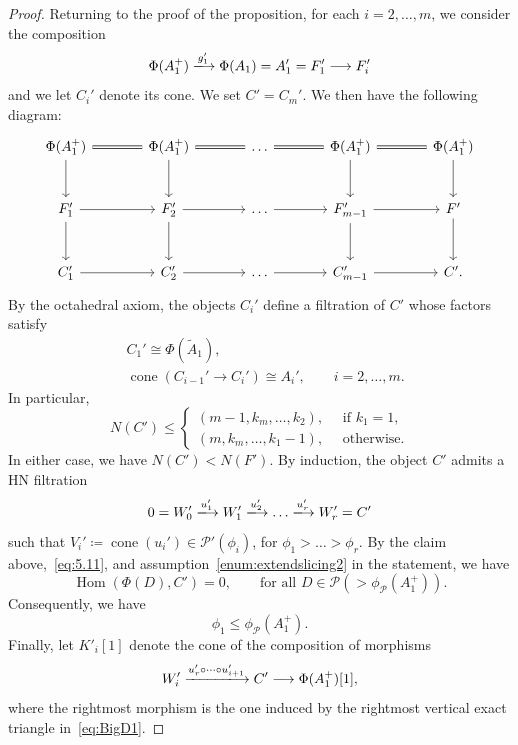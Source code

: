 \documentclass[11pt, reqno]{amsart}
\numberwithin{equation}{section}
\theoremstyle{plain}
\theoremstyle{remark}
\theoremstyle{definition}
\theoremstyle{italicsname}
\DeclareMathOperator{\Hom}{Hom}
\DeclareMathOperator{\cone}{cone}
\newcommand{\cP}{\mathscr{P}}
\begin{document}
\begin{proof}
Returning to the proof of the proposition, for each $i=2,\dots,m$, we consider the composition
\[
\Phi(A_1^+)\xlongrightarrow{g'_1} \Phi(A_1)=A'_1=F'_1\longrightarrow F'_i
\]
and we let $C_i'$ denote its cone. 
We set $C'=C_m'$.
We then have the following diagram:
\begin{equation}\label{eq:BigD1}
\begin{tikzcd}[column sep=large,row sep=large]
\Phi(A_1^+) \arrow[d]
    & \Phi(A_1^+) \arrow[l,equal] \arrow[d]
    & \dots \arrow[l,equal]
    & \Phi(A_1^+) \arrow[l,equal] \arrow[d]
    & \Phi(A_1^+) \arrow[l,equal] \arrow[d]
\\
F'_1 \arrow[r]\arrow[d]
    & F'_2 \arrow[r]\arrow[d]
    & \dots \arrow[r]
    & F'_{m-1} \arrow[r]\arrow[d]
    & F'\arrow[d]
\\
C_1' \arrow[r]
    & C_2' \arrow[r]
    & \dots \arrow[r]
    & C_{m-1}' \arrow[r]
    & C'.
\end{tikzcd}
\end{equation}
By the octahedral axiom, the objects $C_i'$ define a filtration of $C'$ whose factors satisfy
\begin{equation}\label{eq:5.11}
\begin{split}
&C_1'\cong\Phi(\widetilde{A}_1),\\
&\cone(C_{i-1}'\to C_i')\cong  A_i',\qquad i=2,\dots,m.
\end{split}
\end{equation}
In particular,
\[
N(C')\leq\begin{cases}
(m-1,k_m,\dots,k_2),\quad\text{ if } k_1=1,\\
(m,k_m,\dots,k_1-1),\quad\text{ otherwise.}
\end{cases}
\]
In either case, we have $N(C')<N(F')$.
By induction, the object $C'$ admits a HN filtration
\[
0=W_0'\xlongrightarrow{u_1'}W_1'\xlongrightarrow{u_2'}\dots\xlongrightarrow{u_r'} W_r'=C'
\]
such that $V_i'\coloneqq\cone(u_i')\in\cP'(\phi_i)$, for $\phi_1>\dots>\phi_r.$
By the claim above,~\eqref{eq:5.11}, and assumption~\ref{enum:extendslicing2} in the statement, we have
\[
\Hom(\Phi(D),C')=0,\qquad \text{for all } D\in\cP\left(>\phi_\cP(A_1^+)\right).
\]
Consequently, we have
\begin{equation}\label{eq:Phases1}
\phi_1\leq\phi_\cP(A_1^+).
\end{equation}
Finally, let $K'_i[1]$ denote the cone of the composition of morphisms
\[
W_i'\xlongrightarrow{u_r'\circ\dots\circ u_{i+1}'} C'\longrightarrow \Phi(A_1^+)[1],
\]
where the rightmost morphism is the one induced by the rightmost vertical exact triangle in~\eqref{eq:BigD1}.

\end{proof}
\end{document}
